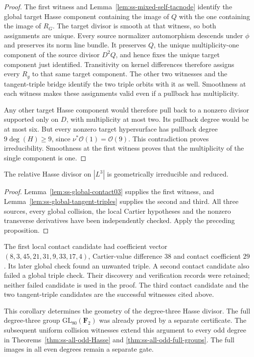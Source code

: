 \begin{proof}
The first witness and Lemma~\ref{lem:ss-mixed-self-tacnode} identify
the global target Hasse component containing the image of $Q$ with
the one containing the image of $R_G$. The target divisor is smooth
at that witness, so both assignments are unique. Every source
normalizer automorphism descends under $\phi$ and preserves its
norm line bundle. It preserves $Q$, the unique multiplicity-one
component of the source divisor $D^2Q$, and hence fixes the unique
target component just identified. Transitivity on kernel differences
therefore assigns every $R_g$ to that same target component.
The other two witnesses and the tangent-triple bridge identify the
two triple orbits with it as well. Smoothness at each witness makes
these assignments valid even if a pullback has multiplicity.

Any other target Hasse component would therefore pull back to a
nonzero divisor supported only on $D$, with multiplicity at most two.
Its pullback degree would be at most six. But every nonzero target
hypersurface has pullback degree $9\deg(H)\ge9$, since
$\nu^*\mathcal O(1)=\mathcal O(9)$. This contradiction proves
irreducibility. Smoothness at the first witness proves that the
multiplicity of the single component is one.
\end{proof}

\begin{corollary}
\label{cor:ss-degree3-hasse-irreducible}
The relative Hasse divisor on $|L^3|$ is geometrically irreducible
and reduced.
\end{corollary}
\begin{proof}
Lemma~\ref{lem:ss-global-contact03} supplies the first witness, and
Lemma~\ref{lem:ss-global-tangent-triples} supplies the second and
third. All three sources, every global collision, the local
Cartier hypotheses and the nonzero transverse derivatives have
been independently checked. Apply the preceding proposition.
\end{proof}

\begin{remark}
The first local contact candidate had coefficient vector
$(8,3,45,21,31,9,33,17,4)$, Cartier-value difference $38$ and
contact coefficient $29$. Its later global check found an unwanted
triple. A second contact candidate also failed a global triple
check. Their discovery and verification records were retained;
neither failed candidate is used in the proof. The third contact
candidate and the two tangent-triple candidates are the successful
witnesses cited above.

This corollary determines the geometry of the degree-three Hasse
divisor. The full degree-three group $\mathrm{GL}_{80}(\mathbf F_2)$
was already proved by a separate certificate. The subsequent uniform collision witnesses extend this argument to
every odd degree in Theorems~\ref{thm:ss-all-odd-Hasse} and
\ref{thm:ss-all-odd-full-groups}. The full images in all even
degrees remain a separate gate.
\end{remark}
